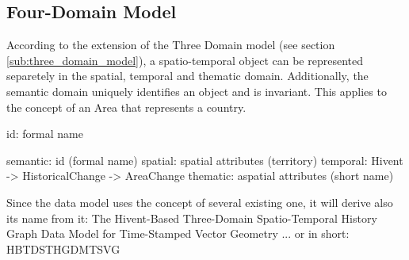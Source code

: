 \addtocounter{footnote}{-4}
\addtocounter{footnote}{1}
\addtocounter{footnote}{1}
\addtocounter{footnote}{1}
\addtocounter{footnote}{1}





\subsection{Four-Domain Model} %
\label{sub:four_domain_model}

According to the extension of the Three Domain model (see section \ref{sub:three_domain_model}), a spatio-temporal object can be represented separetely in the spatial, temporal and thematic domain. Additionally, the semantic domain uniquely identifies an object and is invariant. This applies to the concept of an Area that represents a country.

id: formal name

semantic: id (formal name)
spatial:  spatial attributes (territory)
temporal: Hivent -> HistoricalChange -> AreaChange
thematic: aspatial attributes (short name)

Since the data model uses the concept of several existing one, it will derive also its name from it: The Hivent-Based Three-Domain Spatio-Temporal History Graph Data Model for Time-Stamped Vector Geometry
... or in short: HBTDSTHGDMTSVG

